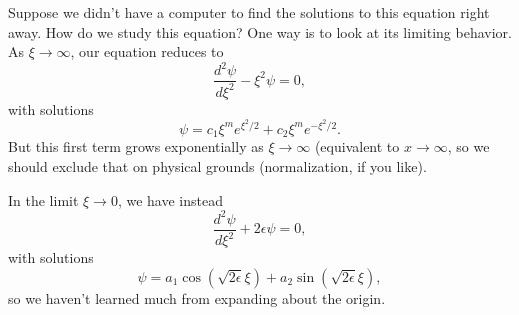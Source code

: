 Suppose we didn't have a computer to find the solutions to this equation right away. How do we study this equation? One way is to look at its limiting behavior. As $\xi\to \infty$, our equation reduces to
\begin{equation}
    \frac{d^2\psi}{d\xi^2}-\xi^2 \psi=0,
\end{equation}
with solutions
\begin{equation}
    \psi = c_1 \xi^m e^{\xi^2/2} + c_2 \xi^m e^{-\xi^2/2}.
\end{equation}
But this first term grows exponentially as $\xi\to \infty$ (equivalent to $x\to \infty$, so we should exclude that on physical grounds (normalization, if you like). 

In the limit $\xi\to 0$, we have instead
\begin{equation}
    \frac{d^2\psi}{d\xi^2} +2\epsilon \psi =0,
\end{equation}
with solutions
\begin{equation}
    \psi = a_1 \cos(\sqrt{2\epsilon}\xi) + a_2\sin(\sqrt{2\epsilon}\xi),
\end{equation}
so we haven't learned much from expanding about the origin.